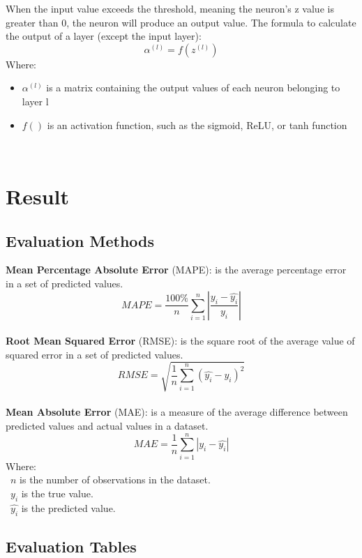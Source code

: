 \documentclass{ieeeojies}
\begin{document}
When the input value exceeds the threshold, meaning the neuron's z value is greater than 0, the neuron will produce an output value. The formula to calculate the output of a layer (except the input layer):
\[ \alpha^{(l)} = f(z^{(l)}) \]
Where:
    \begin{itemize}
        \item $\alpha^{(l)}$ is a matrix containing the output values of each neuron belonging to layer l
        \item  $f()$ is an activation function, such as the sigmoid, ReLU, or tanh function
    \end{itemize}\\
    
\section{Result}
\subsection{Evaluation Methods}
\textbf{Mean Percentage Absolute Error} (MAPE): is the average percentage error in a set of predicted values.\\
\[MAPE=\frac{100\%}{n}  \sum_{i=1}^{n} |\frac{y_i-\hat{y_i}}{y_i}|\]\\
\textbf{Root Mean Squared Error} (RMSE): is the square root of the average value of squared error in a set of predicted values.\\
\[RMSE=\sqrt{\frac{1}{n} \sum_{i=1}^{n}(\hat{y_i}-y_i )^2}\]\\
\textbf{Mean Absolute Error} (MAE): is a measure of the average difference between predicted values and actual values in a dataset.\\
\[MAE = \frac{1}{n} \sum_{i=1}^{n} |y_i - \hat{y_i}| \]
Where: \\
	\indent\textbullet\ \(n\) is the number of observations in the dataset.\\
	\indent\textbullet\ \(y_i\)  is the true value.\\
	\indent\textbullet\ \(\hat{y_i}\) is the predicted value.
        \cite{sefidian_guide}
        
\subsection{Evaluation Tables} 
\end{document}
